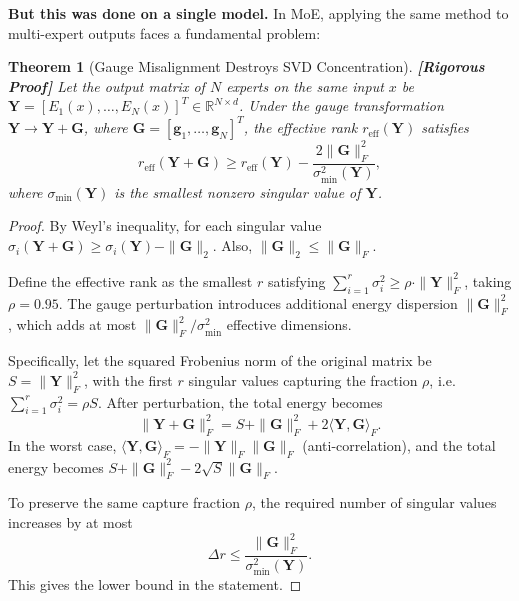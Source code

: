 \documentclass[12pt,a4paper]{article}
\newtheorem{theorem}{Theorem}[section]
\theoremstyle{remark}
\newcommand{\R}{\mathbb{R}}
\newcommand{\rigorFull}{\textnormal{\textbf{[Rigorous Proof]}}}
\begin{document}
\textbf{But this was done on a single model.} In MoE, applying the same method to multi-expert outputs faces a fundamental problem:

\begin{theorem}[Gauge Misalignment Destroys SVD Concentration]\label{thm:svd_gauge}\rigorFull
Let the output matrix of $N$ experts on the same input $x$ be $\mathbf{Y} = [E_1(x), \ldots, E_N(x)]^T \in \R^{N \times d}$. Under the gauge transformation $\mathbf{Y} \to \mathbf{Y} + \mathbf{G}$, where $\mathbf{G} = [\mathbf{g}_1, \ldots, \mathbf{g}_N]^T$, the effective rank $r_{\text{eff}}(\mathbf{Y})$ satisfies
\begin{equation}
    r_{\text{eff}}(\mathbf{Y} + \mathbf{G}) \geq r_{\text{eff}}(\mathbf{Y}) - \frac{2\|\mathbf{G}\|_F^2}{\sigma_{\min}^2(\mathbf{Y})},
\end{equation}
where $\sigma_{\min}(\mathbf{Y})$ is the smallest nonzero singular value of $\mathbf{Y}$.
\end{theorem}

\begin{proof}
By Weyl's inequality, for each singular value $\sigma_i(\mathbf{Y} + \mathbf{G}) \geq \sigma_i(\mathbf{Y}) - \|\mathbf{G}\|_2$. Also, $\|\mathbf{G}\|_2 \leq \|\mathbf{G}\|_F$.

Define the effective rank as the smallest $r$ satisfying $\sum_{i=1}^{r} \sigma_i^2 \geq \rho \cdot \|\mathbf{Y}\|_F^2$, taking $\rho = 0.95$. The gauge perturbation introduces additional energy dispersion $\|\mathbf{G}\|_F^2$, which adds at most $\|\mathbf{G}\|_F^2 / \sigma_{\min}^2$ effective dimensions.

Specifically, let the squared Frobenius norm of the original matrix be $S = \|\mathbf{Y}\|_F^2$, with the first $r$ singular values capturing the fraction $\rho$, i.e. $\sum_{i=1}^{r} \sigma_i^2 = \rho S$. After perturbation, the total energy becomes
\begin{equation}
    \|\mathbf{Y} + \mathbf{G}\|_F^2 = S + \|\mathbf{G}\|_F^2 + 2\langle \mathbf{Y}, \mathbf{G} \rangle_F.
\end{equation}
In the worst case, $\langle \mathbf{Y}, \mathbf{G} \rangle_F = -\|\mathbf{Y}\|_F \|\mathbf{G}\|_F$ (anti-correlation), and the total energy becomes $S + \|\mathbf{G}\|_F^2 - 2\sqrt{S}\|\mathbf{G}\|_F$.

To preserve the same capture fraction $\rho$, the required number of singular values increases by at most
\begin{equation}
    \Delta r \leq \frac{\|\mathbf{G}\|_F^2}{\sigma_{\min}^2(\mathbf{Y})}.
\end{equation}
This gives the lower bound in the statement.
\end{proof}
\end{document}

